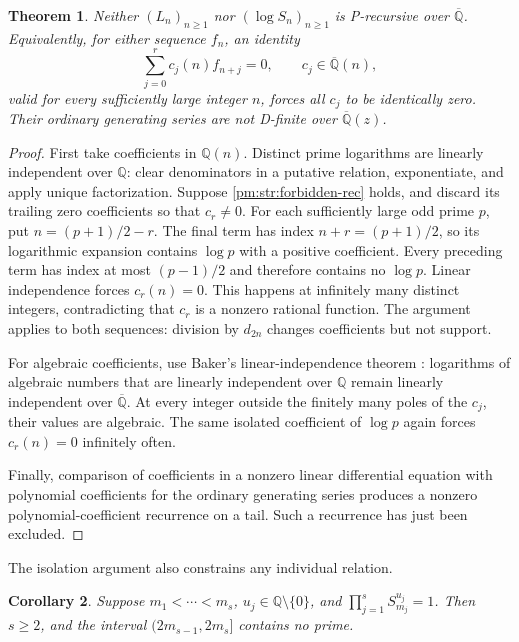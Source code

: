 \documentclass[11pt,a4paper]{article}
\newtheorem{theorem}{Theorem}[section]
\newtheorem{corollary}[theorem]{Corollary}
\theoremstyle{definition}
\theoremstyle{remark}
\numberwithin{equation}{section}
\begin{document}
\begin{theorem}\label{pm:str:log-nonprec}
Neither $(L_n)_{n\geq1}$ nor $(\log S_n)_{n\geq1}$ is P-recursive
over $\overline{\mathbb Q}$.  Equivalently, for either sequence $f_n$,
an identity
\begin{equation}\label{pm:str:forbidden-rec}
 \sum_{j=0}^r c_j(n)f_{n+j}=0,
 \qquad c_j\in\overline{\mathbb Q}(n),
\end{equation}
valid for every sufficiently large integer $n$, forces all $c_j$ to be
identically zero.  Their ordinary generating series are not D-finite
over $\overline{\mathbb Q}(z)$.
\end{theorem}

\begin{proof}
First take coefficients in $\mathbb Q(n)$.  Distinct prime logarithms
are linearly independent over $\mathbb Q$: clear denominators in a
putative relation, exponentiate, and apply unique factorization.
Suppose \eqref{pm:str:forbidden-rec} holds, and discard its trailing zero
coefficients so that $c_r\ne0$.  For each sufficiently large odd prime
$p$, put $n=(p+1)/2-r$.  The final term has index $n+r=(p+1)/2$,
so its logarithmic expansion contains $\log p$ with a positive
coefficient.  Every preceding term has index at most $(p-1)/2$ and
therefore contains no $\log p$.  Linear independence forces $c_r(n)=0$.
This happens at infinitely many distinct integers, contradicting that
$c_r$ is a nonzero rational function.  The argument applies to both
sequences: division by $d_{2n}$ changes coefficients but not support.

For algebraic coefficients, use Baker's linear-independence theorem
\cite{pm:Baker1966}: logarithms of algebraic numbers that are linearly
independent over $\mathbb Q$ remain linearly independent over
$\overline{\mathbb Q}$.  At every integer outside the finitely many
poles of the $c_j$, their values are algebraic.  The same isolated
coefficient of $\log p$ again forces $c_r(n)=0$ infinitely often.

Finally, comparison of coefficients in a nonzero linear differential
equation with polynomial coefficients for the ordinary generating
series produces a nonzero polynomial-coefficient recurrence on a tail.
Such a recurrence has just been excluded.
\end{proof}

The isolation argument also constrains any individual relation.

\begin{corollary}\label{pm:str:last-gap}
Suppose $m_1<\cdots<m_s$, $u_j\in\mathbb Q\setminus\{0\}$, and
$\prod_{j=1}^s S_{m_j}^{u_j}=1$.  Then $s\geq2$, and the interval
$(2m_{s-1},2m_s]$ contains no prime.
\end{corollary}
\end{document}
